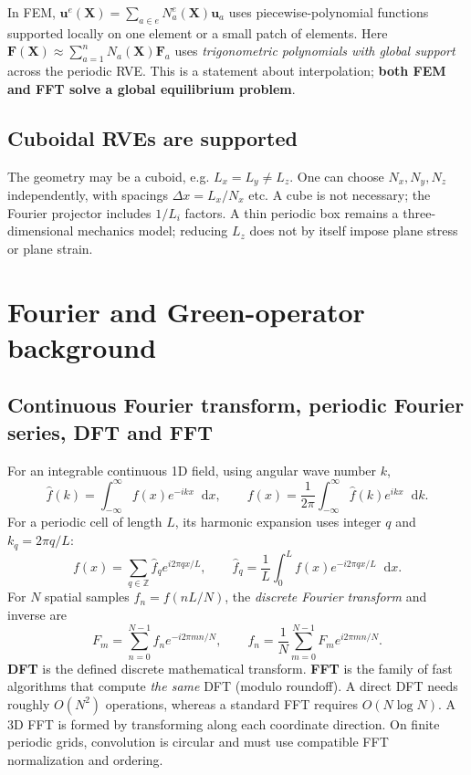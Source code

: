 \documentclass[11pt,a4paper]{article}
\numberwithin{equation}{section}
\newcommand{\F}{\mathbf F}
\newcommand{\Xvec}{\mathbf X}
\newcommand{\uve}{\mathbf u}
\newcommand{\diff}{\mathop{}\!\mathrm d}
\begin{document}
In FEM, $\uve^e(\Xvec)=\sum_{a\in e}N_a^e(\Xvec)\uve_a$ uses piecewise-polynomial functions supported locally on one element or a small patch of elements. Here $\F(\Xvec)\approx\sum_{a=1}^{n}N_a(\Xvec)\F_a$ uses \emph{trigonometric polynomials with global support} across the periodic RVE. This is a statement about interpolation; \textbf{both FEM and FFT solve a global equilibrium problem}.

\subsection{Cuboidal RVEs are supported}
The geometry may be a cuboid, e.g. $L_x=L_y\neq L_z$. One can choose $N_x,N_y,N_z$ independently, with spacings $\Delta x=L_x/N_x$ etc. A cube is not necessary; the Fourier projector includes $1/L_i$ factors. A thin periodic box remains a three-dimensional mechanics model; reducing $L_z$ does not by itself impose plane stress or plane strain.

\section{Fourier and Green-operator background}
\subsection{Continuous Fourier transform, periodic Fourier series, DFT and FFT}
For an integrable continuous 1D field, using angular wave number $k$,
\[
\hat f(k)=\int_{-\infty}^{\infty}f(x)e^{-ikx}\diff x,
\qquad f(x)=\frac1{2\pi}\int_{-\infty}^{\infty}\hat f(k)e^{ikx}\diff k.
\]
For a periodic cell of length $L$, its harmonic expansion uses integer $q$ and $k_q=2\pi q/L$:
\[
f(x)=\sum_{q\in\mathbb Z}\hat f_q e^{i2\pi qx/L},\qquad
\hat f_q=\frac1L\int_0^L f(x)e^{-i2\pi qx/L}\diff x.
\]
For $N$ spatial samples $f_n=f(nL/N)$, the \emph{discrete Fourier transform} and inverse are
\[
F_m=\sum_{n=0}^{N-1}f_n e^{-i2\pi mn/N},\qquad
f_n=\frac1N\sum_{m=0}^{N-1}F_m e^{i2\pi mn/N}.
\]
\textbf{DFT} is the defined discrete mathematical transform. \textbf{FFT} is the family of fast algorithms that compute \emph{the same} DFT (modulo roundoff). A direct DFT needs roughly $O(N^2)$ operations, whereas a standard FFT requires $O(N\log N)$. A 3D FFT is formed by transforming along each coordinate direction. On finite periodic grids, convolution is circular and must use compatible FFT normalization and ordering.
\end{document}
